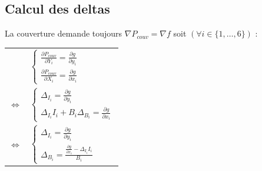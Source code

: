 \documentclass[a4paper,12pt]{article}
\begin{document}
\subsection{Calcul des deltas}
La couverture demande toujours $\nabla P_{couv}=\nabla f$ soit $\left(\forall i\in\{1,\ldots,6\}\right)$ : 
\begin{center}
\begin{tabular}{cl}
& $ \begin{cases}
\frac{\partial P_{couv}}{\partial Y_i} = \frac{\partial g}{\partial y_i} \\
\frac{\partial P_{couv}}{\partial X_i} = \frac{\partial g}{\partial x_i}
\end{cases}
$ \\[2mm]
$\Leftrightarrow$ & $ \begin{cases}
\Delta_{I_i} = \frac{\partial g}{\partial y_i} \\
\Delta_{I_i}I_i+B_i\Delta_{B_i} = \frac{\partial g}{\partial x_i}
\end{cases}
$ \\[1mm]
$\Leftrightarrow$ & $ \begin{cases}
\Delta_{I_i} = \frac{\partial g}{\partial y_i} \\
\Delta_{B_i} = \frac{\frac{\partial g}{\partial x_i}-\Delta_{I_i}I_i}{B_i}
\end{cases}
$
\end{tabular}
\end{center}
 
\end{document}
